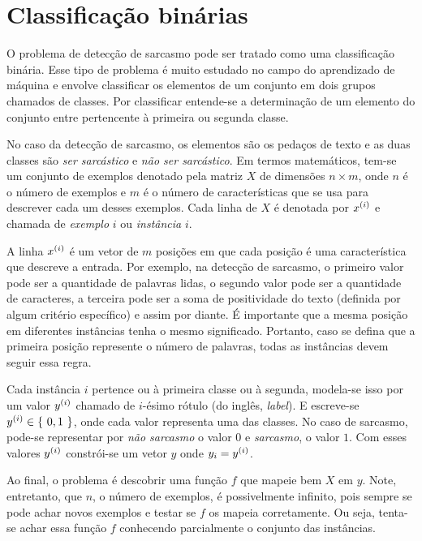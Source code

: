 \section{Classificação binárias}%
\label{sec:classificacao_binarias}

O problema de detecção de sarcasmo pode ser tratado como uma classificação
binária. Esse tipo de problema é muito estudado no campo do aprendizado de
máquina e envolve classificar os elementos de um conjunto em dois grupos
chamados de classes. Por classificar entende-se a determinação de um elemento do
conjunto entre pertencente à primeira ou segunda classe.

No caso da detecção de sarcasmo, os elementos são os pedaços de texto e as duas
classes são \textit{ser sarcástico} e \textit{não ser sarcástico}. Em termos
matemáticos, tem-se um conjunto de exemplos denotado pela matriz $X$ de
dimensões $n\times m$, onde $n$ é o número de exemplos e $m$ é o número de
características que se usa para descrever cada um desses exemplos. Cada linha de
$X$ é denotada por $\xii[x]{i}$ e chamada de \textit{exemplo} $i$ ou
\textit{instância} $i$.

A linha $\xii[x]{i}$ é um vetor de $m$ posições em que cada posição é uma
característica que descreve a entrada. Por exemplo, na detecção de sarcasmo, o
primeiro valor pode ser a quantidade de palavras lidas, o segundo valor pode ser
a quantidade de caracteres, a terceira pode ser a soma de positividade do texto
(definida por algum critério específico) e assim por diante. É importante que a
mesma posição em diferentes instâncias tenha o mesmo significado. Portanto, caso
se defina que a primeira posição represente o número de palavras, todas as
instâncias devem seguir essa regra.

Cada instância $i$ pertence ou à primeira classe ou à segunda, modela-se isso
por um valor $\xii[y]{i}$ chamado de $i$-ésimo rótulo (do inglês,
\textit{label}). E escreve-se $\xii[y]{i}\in\set{0, 1}$, onde cada valor
representa uma das classes. No caso de sarcasmo, pode-se representar por
\textit{não sarcasmo} o valor $0$ e \textit{sarcasmo}, o valor $1$. Com esses
valores $\xii[y]{i}$ constrói-se um vetor $y$ onde $y_i=\xii[y]{i}$.

Ao final, o problema é descobrir uma função $f$ que mapeie bem $X$ em $y$. Note,
entretanto, que $n$, o número de exemplos, é possivelmente infinito, pois sempre
se pode achar novos exemplos e testar se $f$ os mapeia corretamente. Ou seja,
tenta-se achar essa função $f$ conhecendo parcialmente o conjunto das
instâncias.

